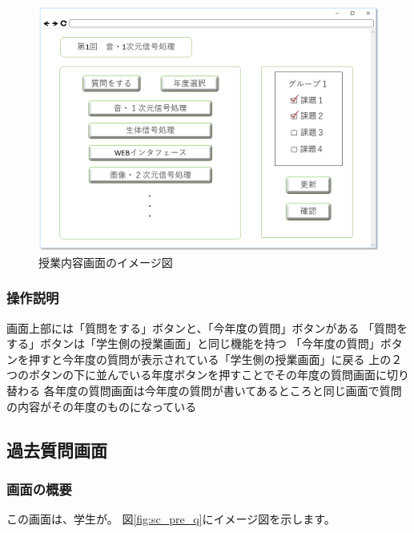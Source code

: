 \begin{figure}[htbp]
\begin{center}
  \includegraphics[width=1\linewidth,clip]{./img/sc_class_content.png}
  \caption{授業内容画面のイメージ図}\label{fig:sc_class_content}
\end{center}
\end{figure}

\subsubsection{操作説明}
画面上部には「質問をする」ボタンと、「今年度の質問」ボタンがある
「質問をする」ボタンは「学生側の授業画面」と同じ機能を持つ
「今年度の質問」ボタンを押すと今年度の質問が表示されている「学生側の授業画面」に戻る
上の２つのボタンの下に並んでいる年度ボタンを押すことでその年度の質問画面に切り替わる
各年度の質問画面は今年度の質問が書いてあるところと同じ画面で質問の内容がその年度のものになっている

\subsection{過去質問画面}
\subsubsection{画面の概要}
この画面は、学生が。
図\ref{fig:sc_pre_q}にイメージ図を示します。

